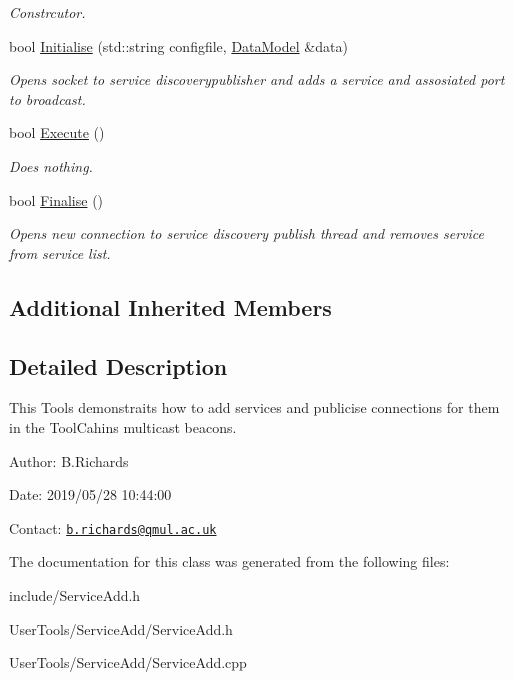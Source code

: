 \begin{DoxyCompactItemize}
\begin{DoxyCompactList}\small\item\em Constrcutor. \end{DoxyCompactList}\item 
\hypertarget{classServiceAdd_a047e44c3d209591703b0bdec1b1b51cd}{bool \hyperlink{classServiceAdd_a047e44c3d209591703b0bdec1b1b51cd}{Initialise} (std\-::string configfile, \hyperlink{classDataModel}{Data\-Model} \&data)}\label{classServiceAdd_a047e44c3d209591703b0bdec1b1b51cd}

\begin{DoxyCompactList}\small\item\em Opens socket to service discoverypublisher and adds a service and assosiated port to broadcast. \end{DoxyCompactList}\item 
\hypertarget{classServiceAdd_a4908df063074b02e73e589d9f07998ac}{bool \hyperlink{classServiceAdd_a4908df063074b02e73e589d9f07998ac}{Execute} ()}\label{classServiceAdd_a4908df063074b02e73e589d9f07998ac}

\begin{DoxyCompactList}\small\item\em Does nothing. \end{DoxyCompactList}\item 
\hypertarget{classServiceAdd_a2e4d3854bcd490935e6e9d39597c7204}{bool \hyperlink{classServiceAdd_a2e4d3854bcd490935e6e9d39597c7204}{Finalise} ()}\label{classServiceAdd_a2e4d3854bcd490935e6e9d39597c7204}

\begin{DoxyCompactList}\small\item\em Opens new connection to service discovery publish thread and removes service from service list. \end{DoxyCompactList}\end{DoxyCompactItemize}
\subsection*{Additional Inherited Members}


\subsection{Detailed Description}
This Tools demonstraits how to add services and publicise connections for them in the Tool\-Cahins multicast beacons.

\begin{DoxyParagraph}{Author\-:}
B.\-Richards 
\end{DoxyParagraph}
\begin{DoxyParagraph}{Date\-:}
2019/05/28 10\-:44\-:00 
\end{DoxyParagraph}
Contact\-: \href{mailto:b.richards@qmul.ac.uk}{\tt b.\-richards@qmul.\-ac.\-uk} 

The documentation for this class was generated from the following files\-:\begin{DoxyCompactItemize}
\item 
include/Service\-Add.\-h\item 
User\-Tools/\-Service\-Add/Service\-Add.\-h\item 
User\-Tools/\-Service\-Add/Service\-Add.\-cpp\end{DoxyCompactItemize}
